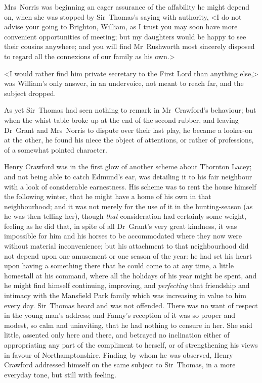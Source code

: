 Mrs~Norris was beginning an eager assurance of the affability he might depend on, when she was stopped by Sir~Thomas's saying with authority, <I do not advise your going to Brighton, William, as I trust you may soon have more convenient opportunities of meeting; but my daughters would be happy to see their cousins anywhere; and you will find Mr~Rushworth most sincerely disposed to regard all the connexions of our family as his own.>

<I would rather find him private secretary to the First Lord than anything else,> was William's only answer, in an undervoice, not meant to reach far, and the subject dropped.

As yet Sir~Thomas had seen nothing to remark in Mr~Crawford's behaviour; but when the whist-table broke up at the end of the second rubber, and leaving Dr~Grant and Mrs~Norris to dispute over their last play, he became a looker-on at the other, he found his niece the object of attentions, or rather of professions, of a somewhat pointed character.

Henry Crawford was in the first glow of another scheme about Thornton Lacey; and not being able to catch Edmund's ear, was detailing it to his fair neighbour with a look of considerable earnestness. His scheme was to rent the house himself the following winter, that he might have a home of his own in that neighbourhood; and it was not merely for the use of it in the hunting-season (as he was then telling her), though \textit{that}  consideration had certainly some weight, feeling as he did that, in spite of all Dr~Grant's very great kindness, it was impossible for him and his horses to be accommodated where they now were without material inconvenience; but his attachment to that neighbourhood did not depend upon one amusement or one season of the year: he had set his heart upon having a something there that he could come to at any time, a little homestall at his command, where all the holidays of his year might be spent, and he might find himself continuing, improving, and \textit{perfecting}  that friendship and intimacy with the Mansfield Park family which was increasing in value to him every day. Sir~Thomas heard and was not offended. There was no want of respect in the young man's address; and Fanny's reception of it was so proper and modest, so calm and uninviting, that he had nothing to censure in her. She said little, assented only here and there, and betrayed no inclination either of appropriating any part of the compliment to herself, or of strengthening his views in favour of Northamptonshire. Finding by whom he was observed, Henry Crawford addressed himself on the same subject to Sir~Thomas, in a more everyday tone, but still with feeling.

